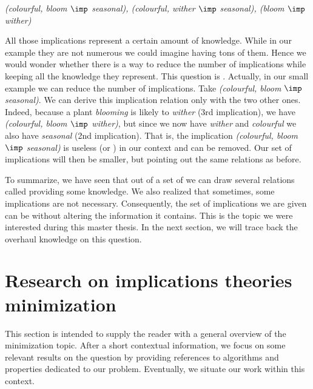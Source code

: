 \begin{center}
	\textit{(colourful, bloom $\imp$ seasonal), (colourful, wither $\imp$ 
		seasonal), (bloom $\imp$ wither)}
\end{center}

\noindent All those implications represent a certain amount of knowledge. While
in our example they are not numerous we could imagine having tons of them. Hence
we would wonder whether there is a way to reduce the number of implications 
while keeping all the knowledge they represent. This question is 
. Actually, in our small example we can reduce
the number of implications. Take \textit{(colourful, bloom $\imp$ seasonal)}. 
We can derive this implication relation only with the two other 
ones. Indeed, because a plant \textit{blooming} is likely to \textit{wither} 
(3rd implication), we have \textit{(colourful, bloom $\imp$ wither)}, but since 
we now have \textit{wither} and \textit{colourful} we also have 
\textit{seasonal} (2nd implication). That is,
the implication \textit{(colourful, bloom $\imp$ seasonal)} is useless (or 
) in our context and can be removed. Our set of implications 
will then be smaller, but pointing out the same relations as before. 

\vspace{1.2em}

To summarize, we have seen that out of a set of  we can draw
several relations called  providing some knowledge. We also
realized that sometimes, some implications are not necessary. Consequently, 
the set of implications we are given can be  without 
altering the information it contains. This is the topic we were interested 
during this master thesis. In the next section, we will trace back the overhaul
knowledge on this question.

\section{Research on implications theories minimization}

This section is intended to supply the reader with a general overview of the
minimization topic. After a short contextual information, we focus on some 
relevant results on the question by providing references to algorithms and 
properties dedicated to our problem. Eventually, we situate our work within this
context.

\vspace{1.2em}

